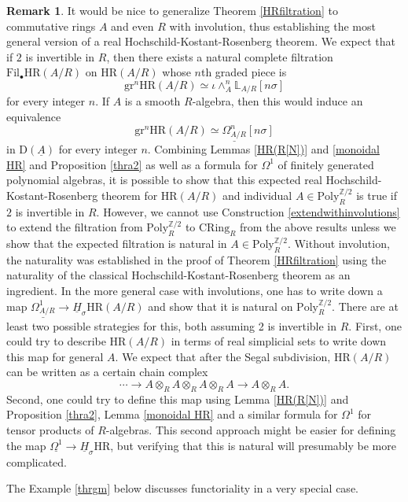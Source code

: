 \documentclass[10pt]{amsart}
\theoremstyle{definition}
\newtheorem{rmk}[thm]{Remark}
\numberwithin{equation}{section}
\renewcommand{\L}{\mathbb{L}}
\newcommand{\Z}{\mathbb{Z}}
\newcommand{\rD}{\mathrm{D}}
\newcommand{\ul}{\underline}
\newcommand{\CRing}{\mathrm{CRing}}
\newcommand{\Poly}{\mathrm{Poly}}
\newcommand{\gr}{\mathrm{gr}}
\newcommand{\Fil}{\mathrm{Fil}}
\newcommand{\HR}{\mathrm{HR}}
\begin{document}
\begin{rmk}\label{addinginvolutions}
It would be nice to generalize Theorem \ref{HRfiltration} to commutative rings $A$ and even $R$ with involution, thus establishing the most general version of a real Hochschild-Kostant-Rosenberg theorem.
We expect that if $2$ is invertible in $R$, then there exists a natural complete filtration $\Fil_\bullet \HR(A/R)$ on $\HR(A/R)$ whose $n$th graded piece is
\[
\gr^n \HR(A/R)
\simeq
\iota \wedge_A^n \L_{A/R}[n\sigma]
\]
for every integer $n$.
If $A$ is a smooth $R$-algebra,
then this would induce
an equivalence
\[
\gr^n \HR(A/R)
\simeq
\ul{\Omega_{A/R}^n}[n\sigma]
\]
in $\rD(\ul{A})$ for every integer $n$.
Combining Lemmas \ref{HR(R[N])} and \ref{monoidal HR} and Proposition
\ref{thra2} as well as a formula for $\Omega^1$ of finitely generated polynomial algebras, it is possible to show that this expected real Hochschild-Kostant-Rosenberg theorem for $\HR(A/R)$ and individual $A \in \Poly_R^{\Z/2}$ is true if $2$ is invertible in $R$.
However, we cannot use Construction \ref{extendwithinvolutions} to extend the filtration from $\Poly_R^{\Z/2}$ to $\CRing_R$ from the above  results unless we show that the expected filtration is natural in $A\in \Poly_R^{\Z/2}$.
Without involution, the naturality was established in the proof of Theorem \ref{HRfiltration} using the naturality of the classical Hochschild-Kostant-Rosenberg  theorem as an ingredient. In the more general case with involutions, one has to 
write down a map  $\ul{\Omega^1_{A/R}} \to \ul{H}_{\sigma}\HR(A/R)$ and show that it is natural on $\Poly_R^{\Z/2}$. There are at least two possible strategies for this, both assuming 2 is invertible in $R$.  First, one could try to describe $\HR(A/R)$ in terms of real simplicial sets to write down this map for general $A$.
We expect that after the Segal subdivision, $\HR(A/R)$ can be written as a certain chain complex
\[
\cdots
\to
A\otimes_R A\otimes_R A\otimes_R A
\to
A\otimes_R A.
\]
Second, one could try to define this map using Lemma \ref{HR(R[N])} and  Proposition \ref{thra2}, Lemma \ref{monoidal HR} and a similar formula for $\Omega^1$ for tensor products of $R$-algebras. This second approach might be easier for defining the map $\ul{\Omega^1}\to \ul{H}_{\sigma}\HR$, but  verifying that this is natural will presumably be more complicated.

The Example \ref{thrgm} below discusses functoriality in a very special case. 


\end{rmk}
\end{document}
